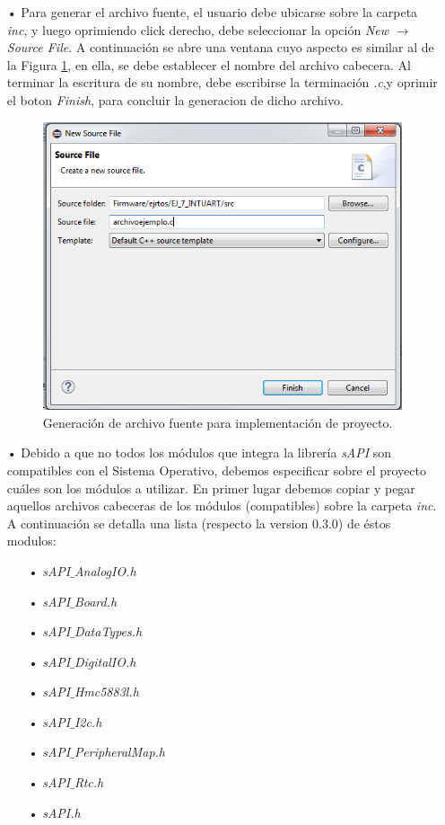 \documentclass[12pt,letterpaper]{article}
\begin{document}
\begin{enumerate}
\item[•]Para generar el archivo fuente, el usuario debe ubicarse sobre la carpeta \textit{inc}, y luego oprimiendo click derecho, debe seleccionar la opción \textit{New} $\rightarrow$ \textit{Source File}. A continuación se abre una ventana cuyo aspecto es similar al de la Figura \ref{archivofuente}, en ella, se debe establecer el nombre del archivo cabecera. Al terminar la escritura de su nombre, debe escribirse la terminación \textit{.c},y oprimir el boton \textit{Finish}, para concluir la generacion de dicho archivo.
\begin{figure}[H]
\centering
\includegraphics[width=8 cm]{figuras/f28.png}
\caption{Generación de archivo fuente para implementación de proyecto.}
\label{archivofuente}
\end{figure}
\item[•]Debido a que no todos los módulos que integra la librería \textit{sAPI} son compatibles con el Sistema Operativo, debemos especificar sobre el proyecto cuáles son los módulos a utilizar. En primer lugar debemos copiar y pegar aquellos archivos cabeceras de los módulos (compatibles) sobre la carpeta \textit{inc}. A continuación se detalla una lista (respecto la version 0.3.0) de éstos modulos:
\begin{enumerate}
\item[•]\textit{sAPI$\_$AnalogIO.h}
\item[•]\textit{sAPI$\_$Board.h}
\item[•]\textit{sAPI$\_$DataTypes.h}
\item[•]\textit{sAPI$\_$DigitalIO.h}
\item[•]\textit{sAPI$\_$Hmc5883l.h}
\item[•]\textit{sAPI$\_$I2c.h}
\item[•]\textit{sAPI$\_$PeripheralMap.h}
\item[•]\textit{sAPI$\_$Rtc.h}
\item[•]\textit{sAPI.h}

\end{enumerate}
\end{enumerate}
\end{document}
